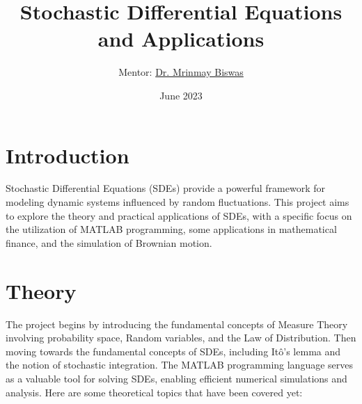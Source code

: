 \documentclass{article}
\title{Stochastic Differential Equations and Applications}
\author{Mentor: \href{https://www.iitk.ac.in/new/mrinmay-biswas}{Dr. Mrinmay Biswas}}
\date{June 2023}
\begin{document}
\maketitle


\section{Introduction}
Stochastic Differential Equations (SDEs) provide a powerful framework for modeling dynamic systems influenced by random fluctuations. This project aims to explore the theory and practical applications of SDEs, with a specific focus on the utilization of MATLAB programming, some applications in mathematical finance, and the simulation of Brownian motion.

\section{Theory}
The project begins by introducing the fundamental concepts of Measure Theory involving probability space, Random variables, and the Law of Distribution. Then moving towards the fundamental concepts of SDEs, including Itô's lemma and the notion of stochastic integration. The MATLAB programming language serves as a valuable tool for solving SDEs, enabling efficient numerical simulations and analysis.
Here are some theoretical topics that have been covered yet:
\end{document}
